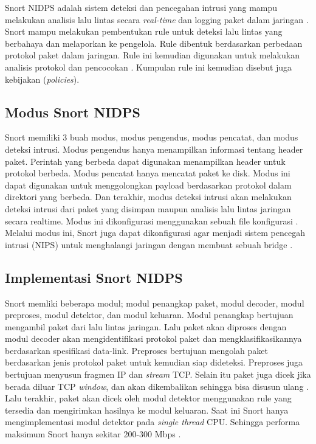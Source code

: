     Snort NIDPS adalah sistem deteksi dan pencegahan intrusi yang mampu melakukan analisis lalu lintas secara \emph{real-time} dan logging paket dalam jaringan \parencite{snortfaq}. Snort mampu melakukan pembentukan rule untuk deteksi lalu lintas yang berbahaya dan melaporkan ke pengelola. Rule dibentuk berdasarkan perbedaan protokol paket dalam jaringan. Rule ini kemudian digunakan untuk melakukan analisis protokol dan pencocokan \parencite{snort}. Kumpulan rule ini kemudian disebut juga kebijakan (\emph{policies}). 

  \subsection{Modus Snort NIDPS}

    Snort memiliki 3 buah modus, modus pengendus, modus pencatat, dan modus deteksi intrusi. Modus pengendus hanya menampilkan informasi tentang header paket. Perintah yang berbeda dapat digunakan menampilkan header untuk protokol berbeda. Modus pencatat hanya mencatat paket ke disk. Modus ini dapat digunakan untuk menggolongkan payload berdasarkan protokol dalam direktori yang berbeda. Dan terakhir, modus deteksi intrusi akan melakukan deteksi intrusi dari paket yang disimpan maupun analisis lalu lintas jaringan secara realtime. Modus ini dikonfigurasi menggunakan sebuah file konfigurasi \parencite{snortfaq}. Melalui modus ini, Snort juga dapat dikonfigurasi agar menjadi sistem pencegah intrusi (NIPS) untuk menghalangi jaringan dengan membuat sebuah bridge \parencite{snort}.

  \subsection{Implementasi Snort NIDPS}

    Snort memliki beberapa modul; modul penangkap paket, modul decoder, modul preproses, modul detektor, dan modul keluaran. Modul penangkap bertujuan mengambil paket dari lalu lintas jaringan. Lalu paket akan diproses dengan modul decoder akan mengidentifikasi protokol paket dan mengklasifikasikannya berdasarkan spesifikasi data-link. Preproses bertujuan mengolah paket berdasarkan jenis protokol paket untuk kemudian siap dideteksi. Preproses juga bertujuan menyusun fragmen IP dan \emph{stream} TCP. Selain itu paket juga dicek jika berada diluar TCP \emph{window}, dan akan dikembalikan sehingga bisa disusun ulang \parencite{snort}. Lalu terakhir, paket akan dicek oleh modul detektor menggunakan rule yang tersedia dan mengirimkan hasilnya ke modul keluaran. Saat ini Snort hanya mengimplementasi modul detektor pada \emph{single thread} CPU. Sehingga performa maksimum Snort hanya sekitar 200-300 Mbps \parencite{albin2012}.

